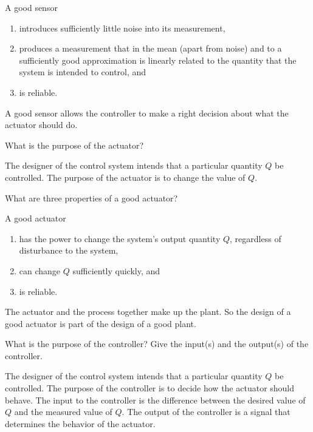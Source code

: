 \begin{solution}
   A good sensor
   \begin{enumerate}
      \item introduces sufficiently little noise into its measurement,
      \item produces a measurement that in the mean (apart from noise) and to a
         sufficiently good approximation is linearly related to the quantity
         that the system is intended to control, and
      \item is reliable.
   \end{enumerate}
   A good sensor allows the controller to make a right decision about what the
   actuator should do.
\end{solution}

\begin{problem}
   What is the purpose of the actuator?
\end{problem}

\begin{solution}
   The designer of the control system intends that a particular quantity $Q$ be
   controlled. The purpose of the actuator is to change the value of $Q$.
\end{solution}

\begin{problem}
   What are three properties of a good actuator?
\end{problem}

\begin{solution}
   A good actuator
   \begin{enumerate}
      \item has the power to change the system's output quantity $Q$,
         regardless of disturbance to the system,
      \item can change $Q$ sufficiently quickly, and
      \item is reliable.
   \end{enumerate}
   The actuator and the process together make up the plant. So the design of a
   good actuator is part of the design of a good plant.
\end{solution}

\begin{problem}
   What is the purpose of the controller? Give the input(s) and the output(s)
   of the controller.
\end{problem}

\begin{solution}
   The designer of the control system intends that a particular quantity $Q$ be
   controlled. The purpose of the controller is to decide how the actuator
   should behave. The input to the controller is the difference between the
   desired value of $Q$ and the measured value of $Q$.  The output of the
   controller is a signal that determines the behavior of the actuator.
\end{solution}


